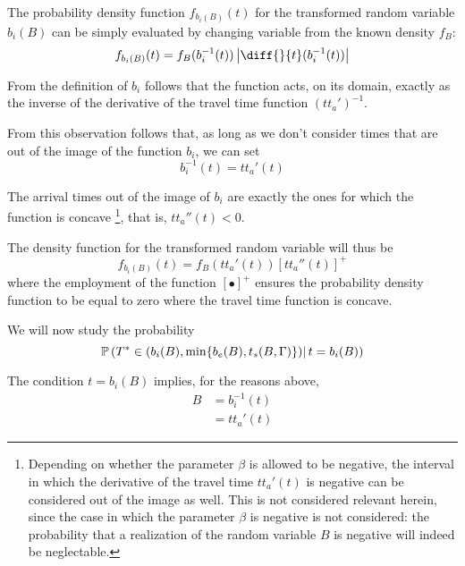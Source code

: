 The probability density function \(f_{b_i(B)}(t)\) for the transformed random variable \(b_i(B)\) can be simply evaluated by changing variable from the known density \(f_B\):
\begin{equation}
  \label{eq:pdf-b-change-var}
  f_{b_i(B)}(t) = f_B(b_i^{-1}(t)) \left| \diff{}{t}(b_i^{-1}(t)) \right|
\end{equation}

From the definition of \(b_i\) follows that the function acts,
on its domain, exactly as the inverse of the derivative of the travel time function \((tt_a')^{-1}\).

From this observation follows that, as long as we don't consider times that are out of the image of the function \(b_i\),
we can set
\begin{equation*}
  b_i^{-1}(t) = tt_a'(t)
\end{equation*}

The arrival times out of the image of \(b_i\) are exactly the ones for which the function is concave
\footnote{
  Depending on whether the parameter \(\beta\) is allowed to be negative,
  the interval in which the derivative of the travel time \(tt_a'(t)\) is negative can be considered out of the image as well.
  This is not considered relevant herein,
  since the case in which the parameter \(\beta\) is negative is not considered:
  the probability that a realization of the random variable \(B\) is negative will indeed be neglectable.
},
that is, \(tt_a''(t) < 0\).

The density function for the transformed random variable will thus be
\begin{equation}
  \label{eq:pdf-b-changed-var}
  f_{b_i(B)}(t) = f_B(tt_a'(t)) [tt_a''(t)]^+
\end{equation}
where the employment of the function \([\bullet]^+\) ensures the probability density function to be equal to zero where the travel time function is concave.

We will now study the probability
\begin{equation*}
  \mathbb{P}\left(T^* \in (b_i(B), \min\{b_e(B), t_s(B, \Gamma)\})|\, t = b_i(B)\right)
\end{equation*}

The condition \(t = b_i(B)\) implies, for the reasons above,
\begin{align*}
  B & = b_i^{-1}(t) \\
    & = tt_a'(t)
\end{align*}

